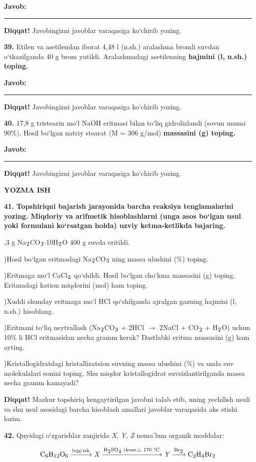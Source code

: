 \documentclass[11pt,a4paper]{article}
\renewcommand{\textsubscript}[1]{\ensuremath{_{\text{\fontsize{8}{8}\selectfont #1}}}}
\newcommand{\diqqat}[1]{\par\smallskip\noindent\textbf{Diqqat!} #1\par\medskip}
\newcommand{\javob}{\par\smallskip\noindent\textbf{Javob:} \rule[-2pt]{7.5cm}{0.4pt}\par\smallskip\noindent\textbf{Diqqat!} Javobingizni javoblar varaqasiga ko`chirib yozing.\par\medskip}
\begin{document}
\javob
\noindent\textbf{39.} Etilen va asetilendan iborat 4,48 l (n.sh.) aralashma bromli suvdan o`tkazilganda 40 g brom yutildi. Aralashmadagi asetilenning \textbf{hajmini (l, n.sh.) toping.}
\javob
\noindent\textbf{40.} 17,8 g tristearin mo`l NaOH eritmasi bilan to`liq gidrolizlandi (sovun unumi 90\%). Hosil bo`lgan natriy stearat (M = 306 g/mol) \textbf{massasini (g) toping.}
\javob
\par\bigskip\begin{center}\textbf{\fontsize{13}{15}\selectfont YOZMA ISH}\end{center}
\noindent\textbf{41.} \textbf{Topshiriqni bajarish jarayonida barcha reaksiya tenglamalarini yozing. Miqdoriy va arifmetik hisoblashlarni (unga asos bo`lgan usul yoki formulani ko`rsatgan holda) uzviy ketma-ketlikda bajaring.}\par{},3 g Na\textsubscript{2}CO\textsubscript{3}$\cdot$10H\textsubscript{2}O 400 g suvda eritildi.\par
{})Hosil bo`lgan eritmadagi Na\textsubscript{2}CO\textsubscript{3} ning massa ulushini (\%) toping.\par
{})Eritmaga mo`l CaCl\textsubscript{2} qo`shildi. Hosil bo`lgan cho`kma massasini (g) toping. Eritmadagi kation miqdorini (mol) ham toping.\par
{})Xuddi shunday eritmaga mo`l HCl qo`shilganda ajralgan gazning hajmini (l, n.sh.) hisoblang.\par
{})Eritmani to`liq neytrallash (Na\textsubscript{2}CO\textsubscript{3} + 2HCl $\to$ 2NaCl + CO\textsubscript{2} + H\textsubscript{2}O) uchun 10\% li HCl eritmasidan necha gramm kerak? Dastlabki eritma massasini (g) ham ayting.\par
{})Kristallogidratdagi kristallizatsion suvning massa ulushini (\%) va unda suv molekulalari sonini toping. Shu miqdor kristallogidrat suvsizlantirilganda massa necha gramm kamayadi?\par
\diqqat{Mazkur topshiriq kengaytirilgan javobni talab etib, uning yechilish usuli va shu usul asosidagi barcha hisoblash amallari javoblar varaqasida aks etishi lozim.}
\noindent\textbf{42.} Quyidagi o`zgarishlar zanjirida \textit{X}, \textit{Y}, \textit{Z} noma'lum organik moddalar:\par
\[\setlength{\fboxsep}{0pt}\text{C\textsubscript{6}H\textsubscript{12}O\textsubscript{6}}\xrightarrow{\text{bijg`ish}}\text{\textit{X}}\xrightarrow{\text{H\textsubscript{2}SO\textsubscript{4} (kons.), 170 \textdegree{}C}}\text{\textit{Y}}\xrightarrow{\text{Br\textsubscript{2}}}\text{C\textsubscript{2}H\textsubscript{4}Br\textsubscript{2}}\]
\end{document}
